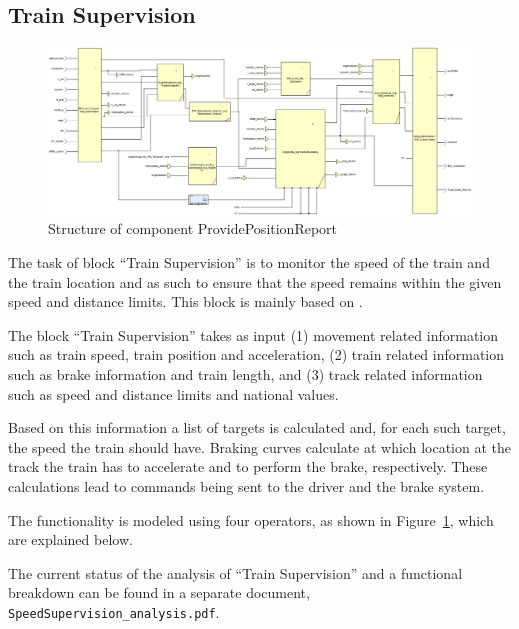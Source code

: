 \subsection{Train Supervision}

\begin{figure}[!h]
\centering
\includegraphics[width=0.95\textheight, angle=90]{../images/speedsupervision.PNG}
\caption{Structure of component ProvidePositionReport}\label{fig:ssv}
\end{figure}

The task of block ``Train Supervision'' is to monitor the speed of the train and the train location and as such to ensure that the speed remains within the given speed and distance limits. This block is mainly based on \cite[Chapt.~3.13]{subset-026}.

The block ``Train Supervision'' takes as input (1) movement related information such as train speed, train position and acceleration, (2) train related information such as brake information and train length, and (3) track related information such as speed and distance limits and national values.

Based on this information a list of targets is calculated and, for each such target, the speed the train should have. Braking curves calculate at which location at the track the train has to accelerate and to perform the brake, respectively. These calculations lead to commands being sent to the driver and the brake system.

The functionality is modeled using four operators, as shown in Figure~\ref{fig:ssv}, which are explained below.

The current status of the analysis of ``Train Supervision'' and a functional breakdown can be found in a separate document, \verb+SpeedSupervision_analysis.pdf+.



